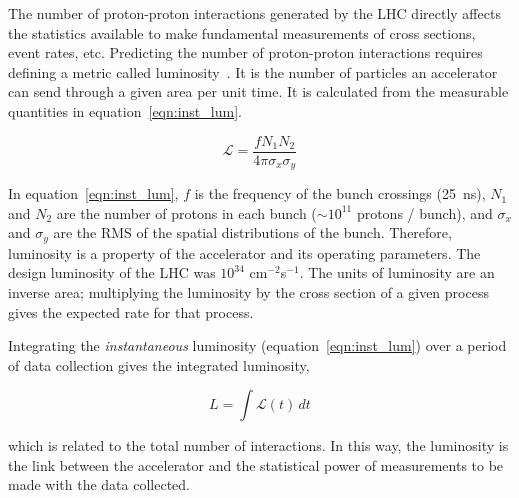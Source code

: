 The number of proton-proton interactions generated by the LHC directly affects the statistics available to make fundamental measurements of cross sections, event rates, etc. 
Predicting the number of proton-proton interactions requires defining a metric called luminosity~\cite{zyla_review_2020}. It is the number of particles an accelerator can send through a given area per unit time. It is calculated from the measurable quantities in equation~\ref{eqn:inst_lum}.

\begin{equation}
\mathcal{L} = \frac{f N_{1} N_{2} }{4 \pi \sigma_{x} \sigma_{y}}
\label{eqn:inst_lum}
\end{equation}

In equation~\ref{eqn:inst_lum}, $f$ is the frequency of the bunch crossings (\SI{25}{\nano\second}), $N_{1}$ and $N_{2}$ are the number of protons in each bunch ($\sim 10^{11}$ protons / bunch), and $\sigma_{x}$ and $\sigma_{y}$ are the RMS of the spatial distributions of the bunch. Therefore, luminosity is a property of the accelerator and its operating parameters. The design luminosity of the LHC was $10^{34}$ cm$^{-2}$s$^{-1}$. The units of luminosity are an inverse area; multiplying the luminosity by the cross section of a given process gives the expected rate for that process.

Integrating the \textit{instantaneous} luminosity (equation~\ref{eqn:inst_lum}) over a period of data collection gives the integrated luminosity,

\begin{equation}
L = \int \mathcal{L} \left( t \right) \,dt
\label{eqn:int_lum}
\end{equation}

which is related to the total number of interactions. In this way, the luminosity is the link between the accelerator and the statistical power of measurements to be made with the data collected. 


